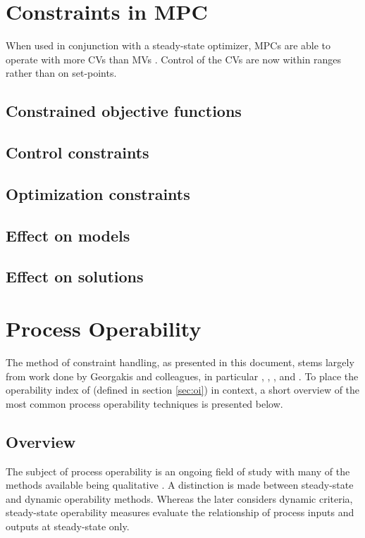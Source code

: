 \section{Constraints in MPC}
When used in conjunction with a steady-state optimizer, MPCs are able to operate with more CVs than MVs \citet{vinsonphd}. 
Control of the CVs are now within ranges rather than on set-points.
\subsection{Constrained objective functions}\label{sec:conobjfn}
\subsection{Control constraints}
\subsection{Optimization constraints}

\subsection{Effect on models}
\subsection{Effect on solutions}

\section{Process Operability}
The method of constraint handling, as presented in this document, stems largely from work done by Georgakis and colleagues, in particular \citet{vinsonphd}, \citet{vinsonartoi}, \citet{limaphd}, \citet{opconproc} and \citet{opidealrx}. 
To place the operability index of \citet{vinsonphd} (defined in section \ref{sec:oi}) in context, a short overview of the most common process operability techniques is presented below.
\subsection{Overview}
The subject of process operability is an ongoing field of study with many of the methods available being qualitative \citep[164]{skogestad}. 
A distinction is made between steady-state and dynamic operability methods. 
Whereas the later considers dynamic criteria, steady-state operability measures evaluate the relationship of process inputs and outputs at steady-state only.
